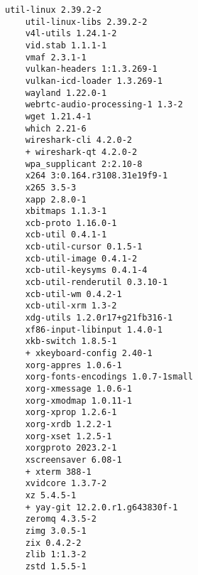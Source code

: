 \documentclass[journal,comsoc]{IEEEtran}
\begin{document}
\begin{multicols}{2}
\begin{tiny}
\begin{lstlisting}[escapeinside=``,breaklines=true]
    util-linux 2.39.2-2
    util-linux-libs 2.39.2-2
    v4l-utils 1.24.1-2
    vid.stab 1.1.1-1
    vmaf 2.3.1-1
    vulkan-headers 1:1.3.269-1
    vulkan-icd-loader 1.3.269-1
    wayland 1.22.0-1
    webrtc-audio-processing-1 1.3-2
    wget 1.21.4-1
    which 2.21-6
    wireshark-cli 4.2.0-2
    + wireshark-qt 4.2.0-2
    wpa_supplicant 2:2.10-8
    x264 3:0.164.r3108.31e19f9-1
    x265 3.5-3
    xapp 2.8.0-1
    xbitmaps 1.1.3-1
    xcb-proto 1.16.0-1
    xcb-util 0.4.1-1
    xcb-util-cursor 0.1.5-1
    xcb-util-image 0.4.1-2
    xcb-util-keysyms 0.4.1-4
    xcb-util-renderutil 0.3.10-1
    xcb-util-wm 0.4.2-1
    xcb-util-xrm 1.3-2
    xdg-utils 1.2.0r17+g21fb316-1
    xf86-input-libinput 1.4.0-1
    xkb-switch 1.8.5-1
    + xkeyboard-config 2.40-1
    xorg-appres 1.0.6-1
    xorg-fonts-encodings 1.0.7-1small
    xorg-xmessage 1.0.6-1
    xorg-xmodmap 1.0.11-1
    xorg-xprop 1.2.6-1
    xorg-xrdb 1.2.2-1
    xorg-xset 1.2.5-1
    xorgproto 2023.2-1
    xscreensaver 6.08-1
    + xterm 388-1
    xvidcore 1.3.7-2
    xz 5.4.5-1
    + yay-git 12.2.0.r1.g643830f-1
    zeromq 4.3.5-2
    zimg 3.0.5-1
    zix 0.4.2-2
    zlib 1:1.3-2
    zstd 1.5.5-1
    \end{lstlisting}
  \end{tiny}
\end{multicols}

\printbibliography[title=Referenser]
\end{document}
